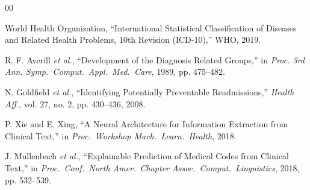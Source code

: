 \documentclass{ieeeaccess}
\begin{document}
\begin{thebibliography}{00}

World Health Organization, ``International Statistical Classification of Diseases and Related Health Problems, 10th Revision (ICD-10),'' WHO, 2019.

R. F. Averill \emph{et al.}, ``Development of the Diagnosis Related Groups,'' in \emph{Proc. 3rd Ann. Symp.\ Comput.\ Appl.\ Med.\ Care}, 1989, pp. 475--482.

N. Goldfield \emph{et al.}, ``Identifying Potentially Preventable Readmissions,'' \emph{Health Aff.}, vol. 27, no. 2, pp. 430--436, 2008.

P. Xie and E. Xing, ``A Neural Architecture for Information Extraction from Clinical Text,'' in \emph{Proc.\ Workshop Mach.\ Learn.\ Health}, 2018.

J. Mullenbach \emph{et al.}, ``Explainable Prediction of Medical Codes from Clinical Text,'' in \emph{Proc.\ Conf.\ North Amer.\ Chapter Assoc.\ Comput.\ Linguistics}, 2018, pp. 532--539.

\end{thebibliography}

\EOD
\end{document}
